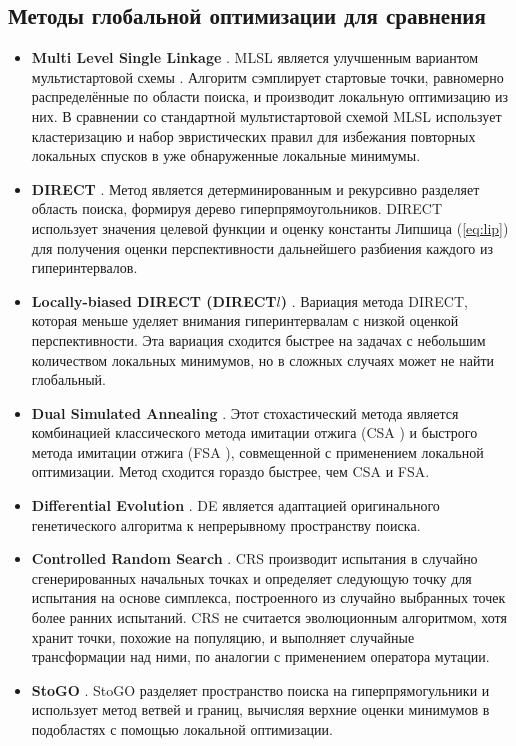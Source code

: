 \subsection{Методы глобальной оптимизации для сравнения}
\begin{itemize}
  \item \textbf{Multi Level Single Linkage} \cite{Kan1987StochasticGO}. MLSL является улучшенным вариантом мультистартовой схемы \cite{Hickernell97asimple}.
  Алгоритм сэмплирует стартовые точки, равномерно распределённые по области поиска, и производит локальную оптимизацию из них.
  В сравнении со стандартной мультистартовой схемой MLSL использует кластеризацию и набор эвристических правил
  для избежания повторных локальных спусков в уже обнаруженные локальные минимумы.

  \item \textbf{DIRECT} \cite{Jones2009}. Метод является детерминированным и рекурсивно разделяет
  область поиска, формируя дерево гиперпрямоугольников. DIRECT использует значения целевой функции и
  оценку константы Липшица (\ref{eq:lip}) для получения оценки перспективности дальнейшего разбиения каждого из гиперинтервалов.

  \item \textbf{Locally-biased DIRECT (DIRECT$l$)} \cite{Gablonsky2001}. Вариация метода
  DIRECT, которая меньше уделяет внимания гиперинтервалам с низкой оценкой перспективности.
  Эта вариация сходится быстрее на задачах с небольшим количеством локальных минимумов,
  но в сложных случаях может не найти глобальный.

  \item \textbf{Dual Simulated Annealing} \cite{XIANG1997216}. Этот стохастический метода является комбинацией
  классического метода имитации отжига (CSA \cite{annealing}) и быстрого метода имитации отжига (FSA \cite{SZU1987157}), совмещенной
  с применением локальной оптимизации. Метод сходится гораздо быстрее, чем CSA и FSA.

  \item \textbf{Differential Evolution} \cite{Storn1997}. DE является адаптацией оригинального генетического алгоритма
  к непрерывному пространству поиска.

  \item \textbf{Controlled Random Search} \cite{Price1983}. CRS производит испытания в случайно сгенерированных начальных
  точках и определяет следующую точку для испытания на основе симплекса, построенного из случайно выбранных точек более ранних испытаний.
  CRS не считается эволюционным алгоритмом, хотя хранит точки, похожие на популяцию, и выполняет случайные трансформации над ними,
  по аналогии с применением оператора мутации.

  \item \textbf{StoGO} \cite{Madsen1998}. StoGO разделяет пространство поиска на гиперпрямогульники и использует метод ветвей и
  границ, вычисляя верхние оценки минимумов в подобластях с помощью локальной оптимизации.
\end{itemize}

